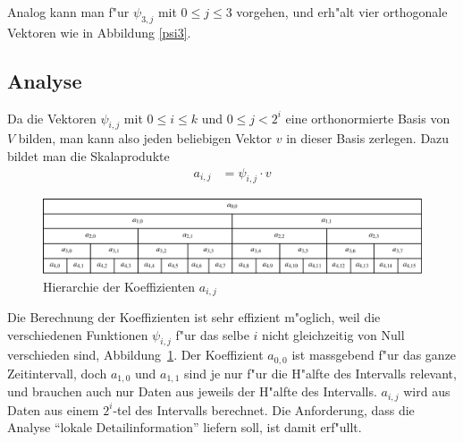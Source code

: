 Analog kann man f"ur $\psi_{3,j}$ mit $0\le j\le 3$ vorgehen, und
erh"alt vier orthogonale Vektoren wie in Abbildung \ref{psi3}.

\subsection{Analyse}
Da die Vektoren $\psi_{i,j}$ mit $0\le i\le k$ und
$0\le j< 2^i$ eine orthonormierte Basis von $V$ bilden, man kann also
jeden beliebigen Vektor $v$ in dieser Basis zerlegen.
Dazu bildet man die Skalaprodukte
\begin{align*}
a_{i,j}&=\psi_{i,j}\cdot v
\end{align*}
\begin{figure}
\begin{center}
\includegraphics[width=\hsize]{images/signal-4}
\end{center}
\caption{Hierarchie der Koeffizienten $a_{i,j}$\label{coefhierarchy}}
\end{figure}
Die Berechnung der Koeffizienten ist sehr effizient m"oglich, weil die
verschiedenen Funktionen $\psi_{i,j}$ f"ur das selbe $i$ nicht gleichzeitig
von Null verschieden sind, Abbildung~\ref{coefhierarchy}.
Der Koeffizient $a_{0,0}$ ist massgebend f"ur das ganze Zeitintervall,
doch $a_{1,0}$ und $a_{1,1}$ sind je nur f"ur die H"alfte des Intervalls
relevant, und brauchen auch nur Daten aus jeweils der H"alfte
des Intervalls. $a_{i,j}$ wird aus Daten aus einem $2^i$-tel des
Intervalls berechnet.
Die Anforderung, dass die Analyse ``lokale Detailinformation''
liefern soll, ist damit erf"ullt.


